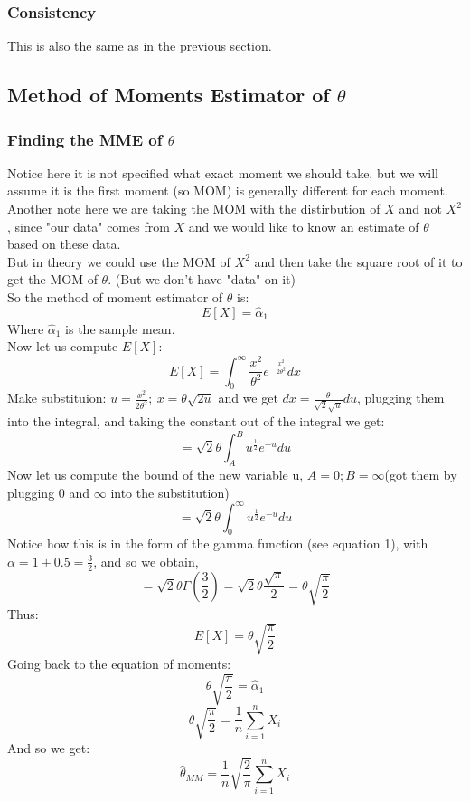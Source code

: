 \documentclass[12pt]{article}
\begin{document}
\subsubsection*{Consistency}
This is also the same as in the previous section.

\subsection*{Method of Moments Estimator of $\theta$}
\subsubsection*{Finding the MME of $\theta$}
Notice here it is not specified what exact moment we should take, but we will assume it is the first moment (so MOM) is generally different for each moment.\\
Another note here we are taking the MOM with the distirbution of $X$ and not $X^2$, since "our data" comes from $X$ and we would like to know an estimate of $\theta$ based on these data.\\
But in theory we could use the MOM of $X^2$ and then take the square root of it to get the MOM of $\theta$. (But we don't have "data" on it)\\
So the method of moment estimator of $\theta$ is:
\[
E[X] = \hat{\alpha}_1
\]
Where $\hat{\alpha}_1$ is the sample mean. \\
Now let us compute $E[X]$: 
\[
E[X]= \int_{0}^{\infty}\frac{x^2}{\theta^2}e^{-\frac{x^2}{2\theta^2}}dx
\]
Make substituion: $u=\frac{x^2}{2\theta^2}; \ x = \theta\sqrt{2u}$ and we get $dx=\frac{\theta}{\sqrt{2}\sqrt{u}}du$, plugging them into the integral, and taking the constant out of the integral we get:
\[
 = \sqrt{2}\theta \int_{A}^{B}u^{\frac{1}{2}}e^{-u}du 
\]
Now let us compute the bound of the new variable u, $A = 0; B=\infty$(got them by plugging $0$ and $\infty$ into the substitution)\\
\[
  = \sqrt{2}\theta \int_{0}^{\infty}u^{\frac{1}{2}}e^{-u}du 
\]
Notice how this is in the form of the gamma function (see equation 1), with $\alpha = 1+0.5=\frac{3}{2}$, and so we obtain, 
\[
 = \sqrt{2}\theta \Gamma(\frac{3}{2}) = \sqrt{2}\theta \frac{\sqrt{\pi}}{2} = \theta\sqrt{\frac{\pi}{2}}
\]
Thus: 
\[
E[X] = \theta\sqrt{\frac{\pi}{2}}
\]
Going back to the equation of moments:
\[
\theta\sqrt{\frac{\pi}{2}} = \hat{\alpha}_1
\]
\[
\theta\sqrt{\frac{\pi}{2}} = \frac{1}{n}\sum_{i=1}^{n}X_i
\]
And so we get: 
\[
\hat{\theta}_{MM} = \frac{1}{n}\sqrt{\frac{2}{\pi}}\sum_{i=1}^{n}X_i
\]
\end{document}
